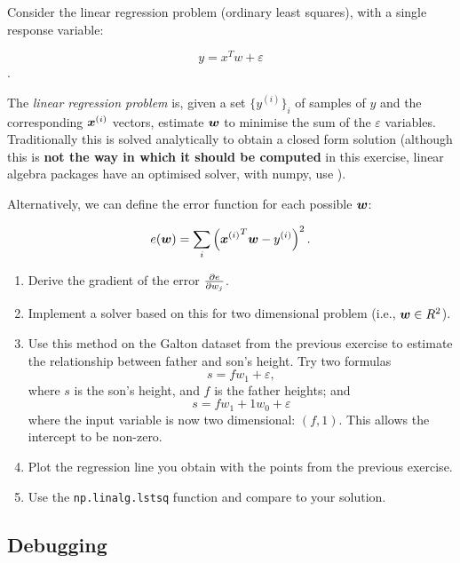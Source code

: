 \begin{exercise}
Consider the linear regression problem (ordinary least squares), with a single response variable:

\[
y = x^T w + \varepsilon
\].

The \emph{linear regression problem} is, given a set $\{ y^{(i)} \}_i$ of
samples of $y$ and the corresponding $\bm{x}^{(i)}$ vectors, estimate
$\bm{w}$ to minimise the sum of the $\varepsilon$ variables. Traditionally
this is solved analytically to obtain a closed form solution (although this is
\textbf{not the way in which it should be computed} in this exercise, linear algebra packages
have an optimised solver, with numpy, use ).

Alternatively, we can define the error function for each possible $\bm{w}$:

\[
e(\bm{w}) = \sum_i \left( {\bm{x}^{(i)}}^T \bm{w} - y^{(i)} \right)^2.
\]

\begin{enumerate}
\item Derive the gradient of the error $\frac{\partial e}{\partial w_j}$.
\item Implement a solver based on this for two dimensional problem (i.e.,
$\bm{w} \in R^2$).
\item Use this method on the Galton dataset from the previous exercise to
estimate the relationship between father and son's height. Try two formulas
\begin{equation}
s = f w_1 + \varepsilon,
\label{}
\end{equation}
where $s$ is the son's height, and $f$ is the father heights; and
\begin{equation}
s = f w_1 + 1w_0 + \varepsilon
\label{}
\end{equation}
where the input variable is now two dimensional: $(f,1)$. This allows the
intercept to be non-zero.
\item Plot the regression line you obtain with the points from the previous
exercise.
\item Use the \texttt{np.linalg.lstsq} function and compare to your solution.
\end{enumerate}
\end{exercise}

\subsection{Debugging}


